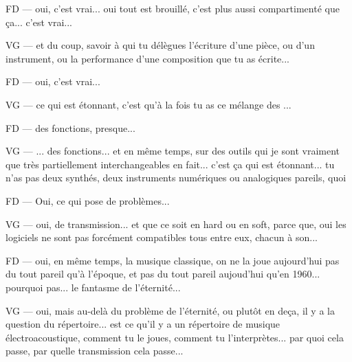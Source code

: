FD — oui, c'est vrai... oui tout est brouillé, c'est plus aussi compartimenté que ça... c'est vrai... 

VG — et du coup, savoir à qui tu délègues l'écriture d'une pièce, ou d'un instrument, ou la performance d'une composition que tu as écrite... 

FD — oui, c'est vrai... 

VG — ce qui est étonnant, c'est qu'à la fois tu as ce mélange des ... 

FD — des fonctions, presque... 

VG — ... des fonctions... et en même temps, sur des outils qui je sont vraiment que très partiellement interchangeables en fait... c'est ça qui est étonnant... tu n'as pas deux synthés, deux instruments numériques ou analogiques pareils, quoi 

FD — Oui, ce qui pose de problèmes... 

VG — oui, de transmission... et que ce soit en hard ou en soft, parce que, oui les logiciels ne sont pas forcément compatibles tous entre eux, chacun à son... 

FD — oui, en même temps, la musique classique, on ne la joue aujourd'hui pas du tout pareil qu'à l'époque, et pas du tout pareil aujoud'hui qu'en 1960... pourquoi pas... le fantasme de l'éternité... 

VG — oui, mais au-delà du problème de l'éternité, ou plutôt en deça, il y a la question du répertoire... est ce qu'il y a un répertoire de musique électroacoustique, comment tu le joues, comment tu l'interprètes... par quoi cela passe, par quelle transmission cela passe... 

